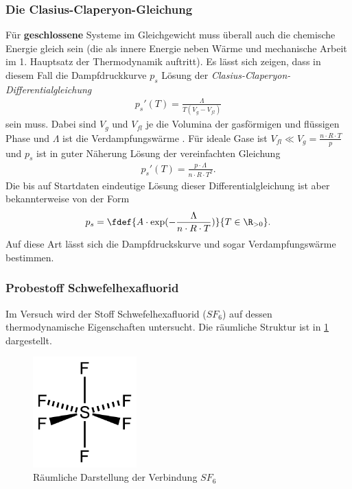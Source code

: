 \documentclass{subfiles}
\begin{document}
\subsubsection{Die Clasius-Claperyon-Gleichung}
	Für \textbf{geschlossene} Systeme im Gleichgewicht muss überall auch die chemische Energie gleich sein (die als innere Energie neben Wärme und mechanische Arbeit im 1. Hauptsatz der Thermodynamik auftritt). Es lässt sich zeigen, dass in diesem Fall die Dampfdruckkurve $p_s$ Lösung der \textit{Clasius-Claperyon-Differentialgleichung} 
	\begin{align*}
		p_s'(T)=\frac{\Lambda}{T(V_{g}-V_{fl})}
	\end{align*}	 
	sein muss. Dabei sind $V_g$ und $V_{fl}$ je die Volumina der gasförmigen und flüssigen Phase und $\Lambda$ ist die Verdampfungswärme \cite[p.131-134]{nolting42}. Für ideale Gase ist $V_{fl}\ll V_{g}=\frac{n\cdot R\cdot T}{p}$ und $p_s$ ist in guter Näherung Lösung der vereinfachten Gleichung
	\begin{align*}
		p_s'(T)=\frac{p\cdot\Lambda}{n\cdot R\cdot T^2}.
	\end{align*}
	Die bis auf Startdaten eindeutige Lösung dieser Differentialgleichung ist aber bekannterweise von der Form
	\begin{align*}
		p_s=\fdef{A\cdot\exp(-\frac{\Lambda}{n\cdot R\cdot T})}{T\in\R_{>0}}.
	\end{align*}
	Auf diese Art lässt sich die Dampfdruckskurve und sogar Verdampfungswärme bestimmen.

  

    \subsubsection{Probestoff Schwefelhexafluorid}
        Im Versuch wird der Stoff Schwefelhexafluorid ($SF_6$) auf dessen thermodynamische Eigenschaften untersucht. Die räumliche Struktur ist in \ref{fig:SF6Struktur} dargestellt.
        \begin{figure}[H]
            \centering
            \includegraphics[width=4cm]{Bilddateien/Grundlagen/SF6.png}
            \caption{Räumliche Darstellung der Verbindung $SF_6$ \cite{SF6wiki}}
            \label{fig:SF6Struktur}
        \end{figure}
\end{document}
